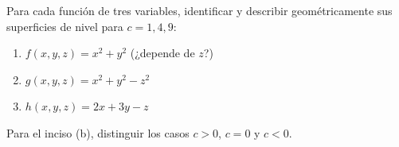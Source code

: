 Para cada función de tres variables, identificar y describir geométricamente sus superficies de nivel para $c = 1, 4, 9$:
\begin{enumerate}
    \item $f(x,y,z) = x^2 + y^2$ \quad (¿depende de $z$?)
    \item $g(x,y,z) = x^2 + y^2 - z^2$
    \item $h(x,y,z) = 2x + 3y - z$
\end{enumerate}
Para el inciso (b), distinguir los casos $c > 0$, $c = 0$ y $c < 0$.